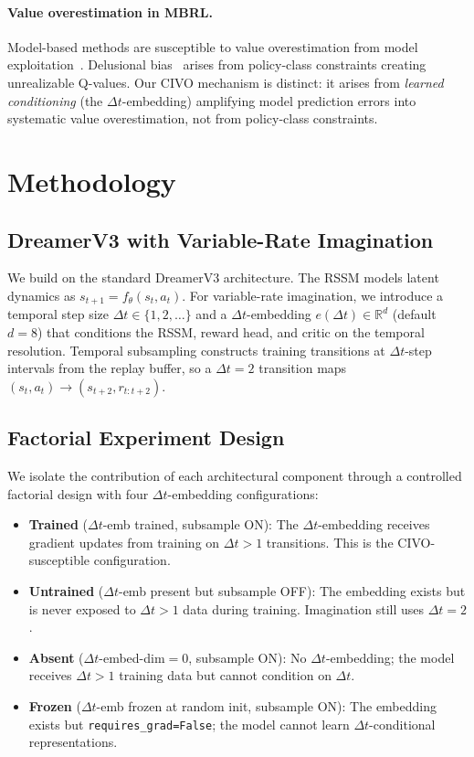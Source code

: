 \documentclass[10pt,letterpaper]{article}
\newcommand{\dt}{\Delta t}
\begin{document}
\paragraph{Value overestimation in MBRL.}
Model-based methods are susceptible to value overestimation from model exploitation~\citep{janner2019mbpo}.
Delusional bias~\citep{lu2018nondelusional} arises from policy-class constraints creating unrealizable Q-values.
Our CIVO mechanism is distinct: it arises from \emph{learned conditioning} (the $\dt$-embedding) amplifying model prediction errors into systematic value overestimation, not from policy-class constraints.

\section{Methodology}

\subsection{DreamerV3 with Variable-Rate Imagination}

We build on the standard DreamerV3 architecture.
The RSSM models latent dynamics as $s_{t+1} = f_\theta(s_t, a_t)$.
For variable-rate imagination, we introduce a temporal step size $\dt \in \{1, 2, \ldots\}$ and a $\dt$-embedding $e(\dt) \in \mathbb{R}^d$ (default $d{=}8$) that conditions the RSSM, reward head, and critic on the temporal resolution.
Temporal subsampling constructs training transitions at $\dt$-step intervals from the replay buffer, so a $\dt{=}2$ transition maps $(s_t, a_t) \to (s_{t+2}, r_{t:t+2})$.

\subsection{Factorial Experiment Design}

We isolate the contribution of each architectural component through a controlled factorial design with four $\dt$-embedding configurations:

\begin{itemize}[nosep,leftmargin=*]
  \item \textbf{Trained} ($\dt$-emb trained, subsample ON): The $\dt$-embedding receives gradient updates from training on $\dt{>}1$ transitions. This is the CIVO-susceptible configuration.
  \item \textbf{Untrained} ($\dt$-emb present but subsample OFF): The embedding exists but is never exposed to $\dt{>}1$ data during training. Imagination still uses $\dt{=}2$.
  \item \textbf{Absent} ($\dt$-embed-dim$=$0, subsample ON): No $\dt$-embedding; the model receives $\dt{>}1$ training data but cannot condition on $\dt$.
  \item \textbf{Frozen} ($\dt$-emb frozen at random init, subsample ON): The embedding exists but \texttt{requires\_grad=False}; the model cannot learn $\dt$-conditional representations.
\end{itemize}
\end{document}

